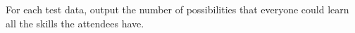 For each test data, output the number of possibilities that 
everyone could learn all the skills the attendees have.
